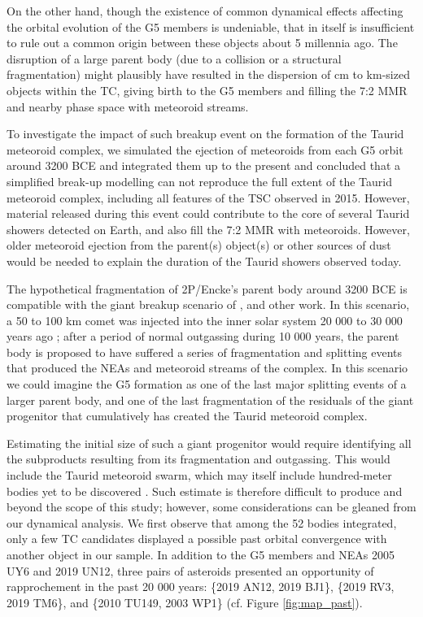 \documentclass[letters,a4paper,fleqn,usenatbib]{mnras}
\begin{document}
On the other hand, though the existence of common dynamical effects affecting the orbital evolution of the G5 members is undeniable, that in itself is insufficient to rule out a common origin between these objects about 5 millennia ago. The disruption of a large parent body (due to a collision or a structural fragmentation) might plausibly have resulted in the dispersion of cm to km-sized objects within the TC, giving birth to the G5 members and filling the 7:2 MMR and nearby phase space with meteoroid streams.

To investigate the impact of such breakup event on the formation of the Taurid meteoroid complex, we simulated the ejection of meteoroids from each G5 orbit around 3200 BCE and integrated them up to the present and concluded that a simplified break-up modelling can not reproduce the full extent of the Taurid meteoroid complex, including all features of the TSC observed in 2015. However, material released during this event could contribute to the core of several Taurid showers detected on Earth, and also fill the 7:2 MMR with meteoroids. However, older meteoroid ejection from the parent(s) object(s) or other sources of dust would be needed to explain the duration of the Taurid showers observed today. 

The hypothetical fragmentation of 2P/Encke's parent body around 3200 BCE is compatible with the giant breakup scenario of \cite{Clube1984}, \cite{Asher1993b} and other work. In this scenario, a 50 to 100 km comet was injected into the inner solar system 20 000 to 30 000 years ago ; after a period of normal outgassing during 10 000 years, the parent body is proposed to have suffered a series of fragmentation and splitting events that produced the NEAs and meteoroid streams of the complex. In this scenario we could imagine the G5 formation as one of the last major splitting events of a larger parent body, and one of the last fragmentation of the residuals of the giant progenitor that cumulatively has created the Taurid meteoroid complex. 

Estimating the initial size of such a giant progenitor would require identifying all the subproducts resulting from its fragmentation and outgassing. This would include the Taurid meteoroid swarm, which may itself include hundred-meter bodies yet to be discovered \citep{Spurny2017,Clark2019}. Such estimate is therefore difficult to produce and beyond the scope of this study; however, some considerations can be gleaned from our dynamical analysis. We first observe that among the 52 bodies integrated, only a few TC candidates displayed a possible past orbital convergence with another object in our sample. In addition to the G5 members and NEAs 2005 UY6 and 2019 UN12, three pairs of asteroids presented an opportunity of rapprochement in the past 20 000 years: \{2019 AN12, 2019 BJ1\}, \{2019 RV3, 2019 TM6\}, and \{2010 TU149, 2003 WP1\} (cf. Figure \ref{fig:map_past}).
\end{document}
